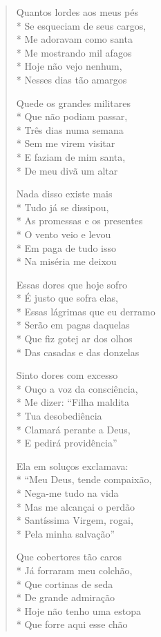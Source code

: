 \begin{verse}
Quantos lordes aos meus pés\\*
Se esqueciam de seus cargos,\\*
Me adoravam como santa\\*
Me mostrando mil afagos\\*
Hoje não vejo nenhum,\\*
Nesses dias tão amargos

Quede os grandes militares\\*
Que não podiam passar,\\*
Três dias numa semana\\*
Sem me virem visitar\\*
E faziam de mim santa,\\*
De meu divã um altar

Nada disso existe mais\\*
Tudo já se dissipou,\\*
As promessas e os presentes\\*
O vento veio e levou\\*
Em paga de tudo isso\\*
Na miséria me deixou

Essas dores que hoje sofro\\*
É justo que sofra elas,\\*
Essas lágrimas que eu derramo\\*
Serão em pagas daquelas\\*
Que fiz gotej ar dos olhos\\*
Das casadas e das donzelas

Sinto dores com excesso\\*
Ouço a voz da consciência,\\*
Me dizer: ``Filha maldita\\*
Tua desobediência\\*
Clamará perante a Deus,\\*
E pedirá providência''

Ela em soluços exclamava:\\*
``Meu Deus, tende compaixão,\\*
Nega-me tudo na vida\\*
Mas me alcançai o perdão\\*
Santíssima Virgem, rogai,\\*
Pela minha salvação''

Que cobertores tão caros\\*
Já forraram meu colchão,\\*
Que cortinas de seda\\*
De grande admiração\\*
Hoje não tenho uma estopa\\*
Que forre aqui esse chão


\end{verse}

